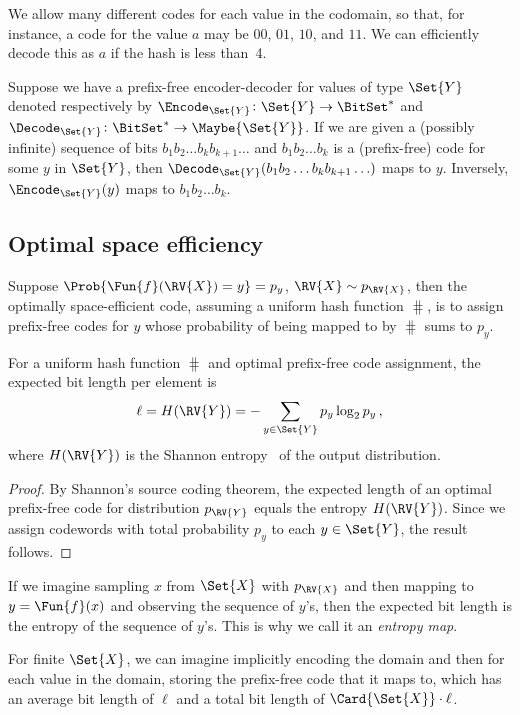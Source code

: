 \documentclass[ ../main.tex]{subfiles}
\begin{document}
We allow many different codes for each value in the codomain, so that, for
instance, a code for the value $a$ may be $00$, $01$, $10$, and $11$.
We can efficiently decode this as $a$ if the hash is less than~4.

Suppose we have a prefix-free encoder-decoder for values of type $\Set{Y}$ denoted respectively by $\Encode_{\Set{Y}} \colon \Set{Y} \to \BitSet^*$ and $\Decode_{\Set{Y}} \colon \BitSet^* \to \Maybe{\Set{Y}}$.
If we are given a (possibly infinite) sequence of bits $b_1 b_2 \ldots b_k b_{k+1} \ldots$ and $b_1 b_2 \ldots b_k$ is a (prefix-free) code for some $y$ in $\Set{Y}$, then $\Decode_{\Set{Y}}(b_1 b_2 \ldots b_k b_{k+1} \ldots)$ maps to $y$.
Inversely, $\Encode_{\Set{Y}}(y)$ maps to $b_1 b_2 \ldots b_k$.

\subsection{Optimal space efficiency}
\label{sec:optimal-code}

Suppose $\Prob{\Fun{f}(\RV{X}) = y} = p_y$, $\RV{X} \sim p_{\RV{X}}$, then the optimally space-efficient code, assuming a uniform hash function $\hash$, is to assign prefix-free codes for $y$ whose probability of being mapped to by $\hash$ sums to $p_y$.

\begin{theorem}
\label{thm:optimal-code}
For a uniform hash function $\hash$ and optimal prefix-free code assignment,
the expected bit length per element is
\begin{equation}
    \ell = H(\RV{Y}) = -\sum_{y \in \Set{Y}} p_y \log_2 p_y\,,
\end{equation}
where $H(\RV{Y})$ is the Shannon entropy~\cite{shannon1948} of the output distribution.
\end{theorem}
\begin{proof}
By Shannon's source coding theorem, the expected length
of an optimal prefix-free code for distribution $p_{\RV{Y}}$ equals the entropy
$H(\RV{Y})$. Since we assign codewords with total probability $p_y$ to each
$y \in \Set{Y}$, the result follows.
\end{proof}

If we imagine sampling $x$ from $\Set{X}$ with $p_{\RV{X}}$ and then mapping to
$y = \Fun{f}(x)$ and observing the sequence of $y$'s, then the expected bit length
is the entropy of the sequence of $y$'s. This is why we call it an
\emph{entropy map}.

For finite $\Set{X}$, we can imagine implicitly encoding the domain and
then for each value in the domain, storing the prefix-free code that it maps
to, which has an average bit length of $\ell$ and a total bit length of
$\Card{\Set{X}} \cdot \ell$.
\end{document}
